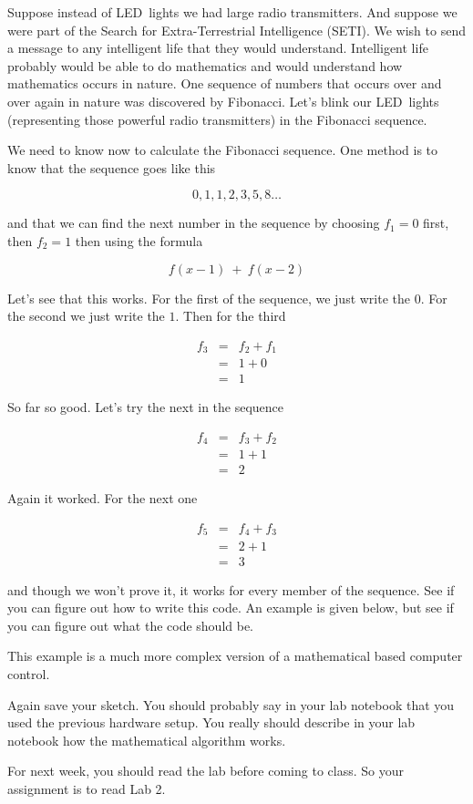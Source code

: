 Suppose instead of LED\ lights we had large radio transmitters. And suppose
we were part of the Search for Extra-Terrestrial Intelligence (SETI). We
wish to send a message to any intelligent life that they would understand.
Intelligent life probably would be able to do mathematics and would
understand how mathematics occurs in nature. One sequence of numbers that
occurs over and over again in nature was discovered by Fibonacci. Let's
blink our LED\ lights (representing those powerful radio transmitters) in
the Fibonacci sequence.

We need to know now to calculate the Fibonacci sequence. One method is to
know that the sequence goes like this

\begin{equation*}
	0,1,1,2,3,5,8\ldots
\end{equation*}

and that we can find the next number in the sequence by choosing $f_{1}=0$
first, then $f_{2}=1$ then using the formula 

\begin{equation*}
	f(x-1)\ +\ f(x-2)
\end{equation*}

Let's see that this works. For the first of the sequence, we just write the $
0.$ For the second we just write the $1.$ Then for the third 

\begin{eqnarray*}
	f_{3} &=&f_{2}+f_{1} \\
	&=&1+0 \\
	&=&1
\end{eqnarray*}

So far so good. Let's try the next in the sequence

\begin{eqnarray*}
	f_{4} &=&f_{3}+f_{2} \\
	&=&1+1 \\
	&=&2
\end{eqnarray*}

Again it worked. For the next one

\begin{eqnarray*}
	f_{5} &=&f_{4}+f_{3} \\
	&=&2+1 \\
	&=&3
\end{eqnarray*}

and though we won't prove it, it works for every member of the sequence. See
if you can figure out how to write this code. An example is given below, but
see if you can figure out what the code should be.

This example is a much more complex version of a mathematical based computer
control.



Again save your sketch. You should probably say in your lab notebook that
you used the previous hardware setup. You really should describe in your lab
notebook how the mathematical algorithm works.

For next week, you should read the lab before coming to class. So your
assignment is to read Lab 2.

\vspace*{\fill}
\pagebreak
